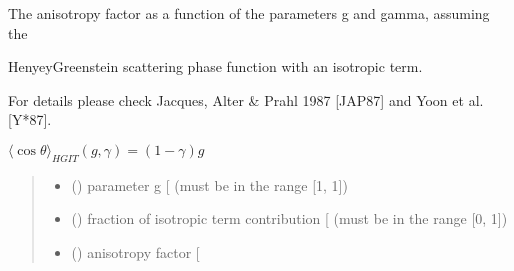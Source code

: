 \documentclass[letterpaper,10pt,english]{sphinxmanual}
\begin{document}

\begin{fulllineitems}
\label{\detokenize{06_anisotropy_factor:skinoptics.anisotropy_factor.costheta_HGIT}}
\pysigstartsignatures
{}
\pysigstopsignatures
\begin{DUlineblock}{0em}
\item[] The anisotropy factor as a function of the parameters g and gamma, assuming the
\item[] Henyey\sphinxhyphen{}Greenstein scattering phase function with an isotropic term.
\item[] For details please check Jacques, Alter \& Prahl 1987 {[}JAP87{]} and Yoon et al. {[}Y*87{]}.
\end{DUlineblock}

\sphinxAtStartPar
\(\langle \cos\theta \rangle_{HGIT}(g, \gamma) = (1 - \gamma) g\)
\begin{quote}\begin{description}
\begin{itemize}
\item {} 
\sphinxAtStartPar
{} () \textendash{} parameter g {[}\sphinxhyphen{}{]} (must be in the range {[}\sphinxhyphen{}1, 1{]})

\item {} 
\sphinxAtStartPar
{} () \textendash{} fraction of isotropic term contribution {[}\sphinxhyphen{}{]} (must be in the range {[}0, 1{]})

\end{itemize}

\sphinxAtStartPar
\begin{itemize}
\item {} 
\sphinxAtStartPar
{} () \textendash{} anisotropy factor {[}\sphinxhyphen{}{]}

\end{itemize}


\end{description}\end{quote}

\end{fulllineitems}
\end{document}
